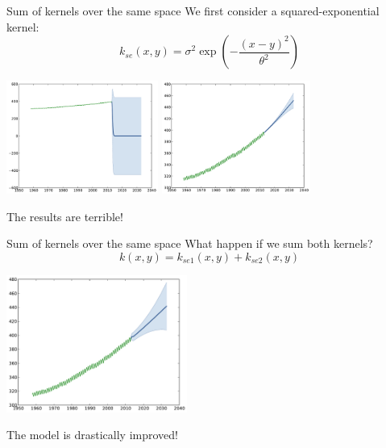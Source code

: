 \documentclass{beamer}
\begin{document}
\begin{frame}{Sum of kernels over the same space }
We first consider a squared-exponential kernel:
$$ \displaystyle k_{se}(x,y) = \sigma^2\exp \left(-\frac{(x-y)^2}{\theta^2} \right)$$
\begin{center}
\includegraphics[height=3.7cm]{figures/python/CO2-rbfa} \quad \includegraphics[height=3.7cm]{figures/python/CO2-rbfb}
\end{center}
\begin{block}{}
\centering
\alert{The results are terrible!}
\end{block}
\end{frame}

\begin{frame}{Sum of kernels over the same space }
What happen if we sum both kernels?
\begin{equation*}
k(x,y) = k_{se1}(x,y) + k_{se2}(x,y)
\end{equation*}
\pause
\begin{center}
\vspace{-8mm} \includegraphics[height=4.5cm]{figures/python/CO2-rbfab}
\end{center}
\begin{block}{}
\centering
\alert{The model is drastically improved!}
\end{block}
\end{frame}
\end{document}
